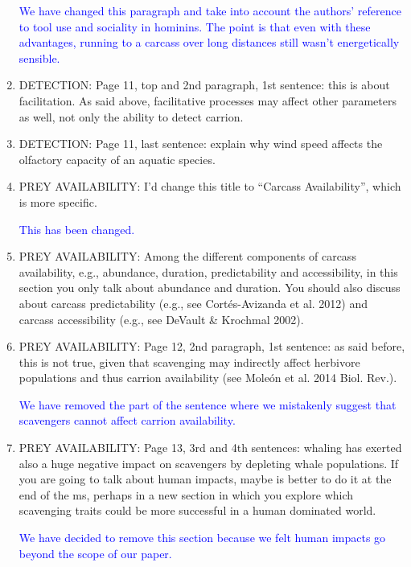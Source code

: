 \documentclass[12pt,letterpaper]{article}
\begin{document}
\begin{enumerate}
\textcolor{blue}{We have changed this paragraph and take into account the authors' reference to tool use and sociality in hominins. The point is that even with these advantages, running to a carcass over long distances still wasn't energetically sensible.}

\item{DETECTION:} Page 11, top and 2nd paragraph, 1st sentence: this is about facilitation. As said above, facilitative processes may affect other parameters as well, not only the ability to detect carrion.

\item{DETECTION:} Page 11, last sentence: explain why wind speed affects the olfactory capacity of an aquatic species.

\item{PREY AVAILABILITY:} I'd change this title to ``Carcass Availability'', which is more specific.

\textcolor{blue}{This has been changed.}

\item{PREY AVAILABILITY:} Among the different components of carcass availability, e.g., abundance, duration, predictability and accessibility, in this section you only talk about abundance and duration. You should also discuss about carcass predictability (e.g., see Cort\'{e}s-Avizanda et al. 2012) and carcass accessibility (e.g., see DeVault \& Krochmal 2002).

\item{PREY AVAILABILITY:} Page 12, 2nd paragraph, 1st sentence: as said before, this is not true, given that scavenging may indirectly affect herbivore populations and thus carrion availability (see Mole\'{o}n et al. 2014 Biol. Rev.).

\textcolor{blue}{We have removed the part of the sentence where we mistakenly suggest that scavengers cannot affect carrion availability.}

\item{PREY AVAILABILITY:} Page 13, 3rd and 4th sentences: whaling has exerted also a huge negative impact on scavengers by depleting whale populations. If you are going to talk about human impacts, maybe is better to do it at the end of the ms, perhaps in a new section in which you explore which scavenging traits could be more successful in a human dominated world.

\textcolor{blue}{We have decided to remove this section because we felt human impacts go beyond the scope of our paper.}


\end{enumerate}
\end{document}
